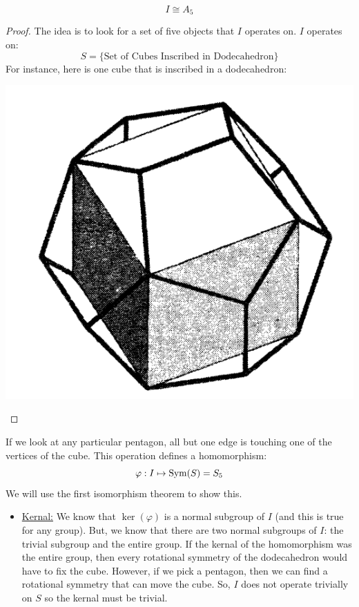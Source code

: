 \documentclass[letterpaper]{article}
\begin{document}
\begin{theorem}{}{}
    \[I \cong A_5\]
\end{theorem}

\begin{mdframed}
    \begin{proof}
        The idea is to look for a set of five objects that $I$ operates on. $I$ operates on: 
        \[S = \{\text{Set of Cubes Inscribed in Dodecahedron}\}\]
        For instance, here is one cube that is inscribed in a dodecahedron: 
        \begin{center}
            \includegraphics[scale=0.3]{assets/dodeca_cube.png}
        \end{center} 
    \end{proof}
    If we look at any particular pentagon, all but one edge is touching one of the vertices of the cube. This operation defines a homomorphism: 
    \[\varphi: I \mapsto \operatorname{Sym}(S) = S_5\]
    We will use the first isomorphism theorem to show this. 
    \begin{itemize}
        \item \underline{Kernal:} We know that $\ker(\varphi)$ is a normal subgroup of $I$ (and this is true for any group). But, we know that there are two normal subgroups of $I$: the trivial subgroup and the entire group. If the kernal of the homomorphism was the entire group, then every rotational symmetry of the dodecahedron would have to fix the cube. However, if we pick a pentagon, then we can find a rotational symmetry that can move the cube. So, $I$ does not operate trivially on $S$ so the kernal must be trivial. 

\end{itemize}
\end{mdframed}
\end{document}
